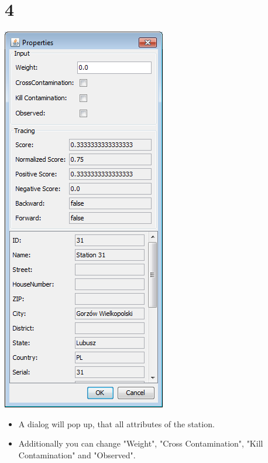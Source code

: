 \documentclass{beamer}
\begin{document}
\section{4}
\begin{frame}
	\begin{center}
  		\includegraphics[height=0.6\textheight]{4.png}
	\end{center}
	\begin{itemize}
		\item A dialog will pop up, that all attributes of the station.
		\item Additionally you can change "Weight", "Cross Contamination", "Kill Contamination" and "Observed".		
	\end{itemize}
\end{frame}
\end{document}
